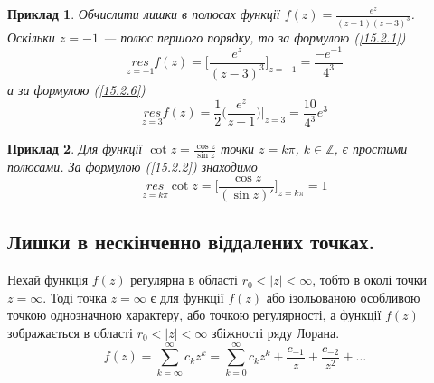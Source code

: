 \documentclass[12pt,fleqn]{article}
\newtheorem{exm}{Приклад}[section]
\theoremstyle{theorem}
\theoremstyle{proof}
\numberwithin{figure}{section}
\numberwithin{equation}{section}
\begin{document}
\begin{exm}\label{exm.15.2.1}
  Обчислити лишки в полюсах функції $f(z)=\frac{e^z}{(z+1)(z-3)^3}$.
  Оскільки $z=-1$ --- полюс першого порядку, то за формулою (\ref{15.2.1})
  \[\underset{z=-1}{res}f(z)=\Big[\frac{e^z}{(z-3)^3}\Big]_{z=-1}=\frac{-e^{-1}}{4^3}\]
  а за формулою (\ref{15.2.6})
  \[\underset{z=3}{res}f(z)=\frac{1}{2}\bigg(\frac{e^z}{z+1}\bigg)\Bigg|_{z=3}=\frac{10}{4^3}e^3\]
\end{exm}

\begin{exm}\label{exm.15.2.2}
  Для функції $\cot z=\frac{\cos z}{\sin z}$ точки $z=k\pi$, $k \in \mathbb{Z}$, є простими полюсами. За формулою (\ref{15.2.2}) знаходимо
    \[\underset{z=k\pi}{res}\cot z=\Big[\frac{\cos z}{(\sin z)'} \Big]_{z=k\pi}=1\]
\end{exm}
\subsection{Лишки в нескінченно віддалених точках.}
Нехай функція $f(z)$ регулярна в області $r_0<|z|<\infty$, тобто в околі точки $z=\infty$. Тоді точка $z=\infty$ є для функції $f(z)$ або ізольованою особливою точкою однозначною характеру, або точкою регулярності, а функції $f(z)$ зображається в області $r_0<|z|<\infty$ збіжності ряду Лорана.
\begin{equation}\label{15.3.1}
  f(z)=\sum_{k=\infty}^{\infty}c_kz^k=\sum_{k=0}^{\infty}c_kz^k+\frac{c_{-1}}{z} + \frac{c_{-2}}{z^2}+\dots
\end{equation}
\end{document}
